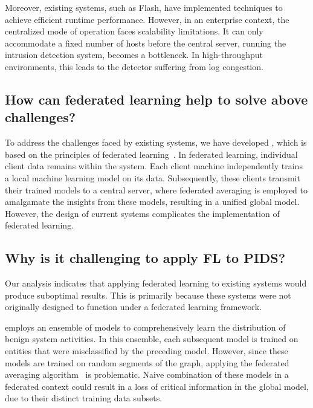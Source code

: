 Moreover, existing systems, such as Flash, have implemented techniques to achieve efficient runtime performance. However, in an enterprise context, the centralized mode of operation faces scalability limitations. It can only accommodate a fixed number of hosts before the central server, running the intrusion detection system, becomes a bottleneck. In high-throughput environments, this leads to the detector suffering from log congestion.

\subsection{How can federated learning help to solve above challenges?}

To address the challenges faced by existing systems, we have developed \Sys, which is based on the principles of federated learning~\cite{mcmahan2017communication}. In federated learning, individual client data remains within the system. Each client machine independently trains a local machine learning model on its data. Subsequently, these clients transmit their trained models to a central server, where federated averaging is employed to amalgamate the insights from these models, resulting in a unified global model. However, the design of current systems complicates the implementation of federated learning. 


\subsection{Why is it challenging to apply FL to PIDS?}


Our analysis indicates that applying federated learning to existing systems would produce suboptimal results. This is primarily because these systems were not originally designed to function under a federated learning framework.

\threatrace employs an ensemble of \gnnshort models to comprehensively learn the distribution of benign system activities. In this ensemble, each subsequent model is trained on entities that were misclassified by the preceding model. However, since these models are trained on random segments of the graph, applying the federated averaging algorithm~\cite{mcmahan2017communication} is problematic. Naive combination of these models in a federated context could result in a loss of critical information in the global model, due to their distinct training data subsets.


